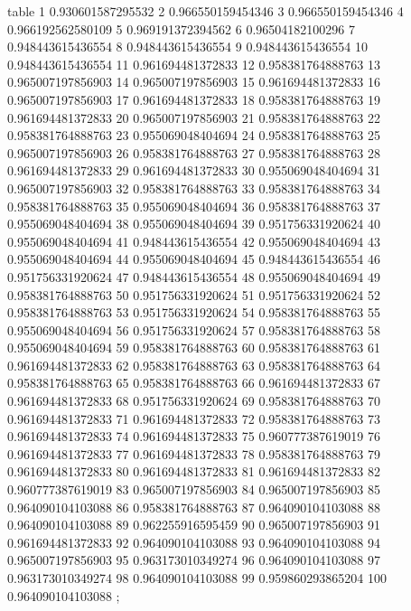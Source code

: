 table {%
	1 0.930601587295532
	2 0.966550159454346
	3 0.966550159454346
	4 0.966192562580109
	5 0.969191372394562
	6 0.96504182100296
	7 0.948443615436554
	8 0.948443615436554
	9 0.948443615436554
	10 0.948443615436554
	11 0.961694481372833
	12 0.958381764888763
	13 0.965007197856903
	14 0.965007197856903
	15 0.961694481372833
	16 0.965007197856903
	17 0.961694481372833
	18 0.958381764888763
	19 0.961694481372833
	20 0.965007197856903
	21 0.958381764888763
	22 0.958381764888763
	23 0.955069048404694
	24 0.958381764888763
	25 0.965007197856903
	26 0.958381764888763
	27 0.958381764888763
	28 0.961694481372833
	29 0.961694481372833
	30 0.955069048404694
	31 0.965007197856903
	32 0.958381764888763
	33 0.958381764888763
	34 0.958381764888763
	35 0.955069048404694
	36 0.958381764888763
	37 0.955069048404694
	38 0.955069048404694
	39 0.951756331920624
	40 0.955069048404694
	41 0.948443615436554
	42 0.955069048404694
	43 0.955069048404694
	44 0.955069048404694
	45 0.948443615436554
	46 0.951756331920624
	47 0.948443615436554
	48 0.955069048404694
	49 0.958381764888763
	50 0.951756331920624
	51 0.951756331920624
	52 0.958381764888763
	53 0.951756331920624
	54 0.958381764888763
	55 0.955069048404694
	56 0.951756331920624
	57 0.958381764888763
	58 0.955069048404694
	59 0.958381764888763
	60 0.958381764888763
	61 0.961694481372833
	62 0.958381764888763
	63 0.958381764888763
	64 0.958381764888763
	65 0.958381764888763
	66 0.961694481372833
	67 0.961694481372833
	68 0.951756331920624
	69 0.958381764888763
	70 0.961694481372833
	71 0.961694481372833
	72 0.958381764888763
	73 0.961694481372833
	74 0.961694481372833
	75 0.960777387619019
	76 0.961694481372833
	77 0.961694481372833
	78 0.958381764888763
	79 0.961694481372833
	80 0.961694481372833
	81 0.961694481372833
	82 0.960777387619019
	83 0.965007197856903
	84 0.965007197856903
	85 0.964090104103088
	86 0.958381764888763
	87 0.964090104103088
	88 0.964090104103088
	89 0.962255916595459
	90 0.965007197856903
	91 0.961694481372833
	92 0.964090104103088
	93 0.964090104103088
	94 0.965007197856903
	95 0.963173010349274
	96 0.964090104103088
	97 0.963173010349274
	98 0.964090104103088
	99 0.959860293865204
	100 0.964090104103088
};
